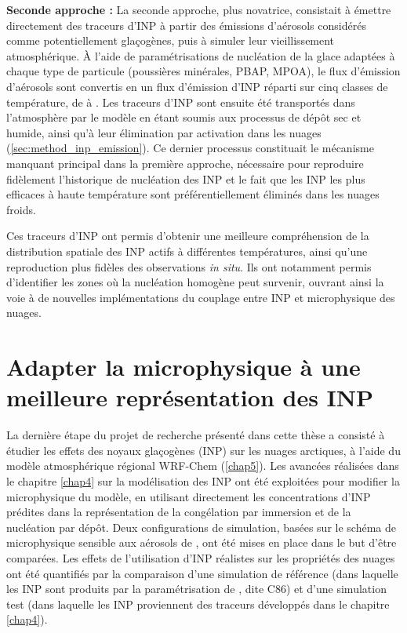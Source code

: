 \medskip
\noindent
\textbf{Seconde approche :}  
La seconde approche, plus novatrice, consistait à émettre directement des traceurs d’INP à partir des émissions d’aérosols considérés comme potentiellement glaçogènes, puis à simuler leur vieillissement atmosphérique.  
À l’aide de paramétrisations de nucléation de la glace adaptées à chaque type de particule (poussières minérales, PBAP, MPOA), le flux d’émission d’aérosols sont convertis en un flux d’émission d’INP réparti sur cinq classes de température, de  à .  
Les traceurs d’INP sont ensuite été transportés dans l’atmosphère par le modèle en étant soumis aux processus de dépôt sec et humide, ainsi qu’à leur élimination par activation dans les nuages (\cref{sec:method_inp_emission}).  
Ce dernier processus constituait le mécanisme manquant principal dans la première approche, nécessaire pour reproduire fidèlement l’historique de nucléation des INP et le fait que les INP les plus efficaces à haute température sont préférentiellement éliminés dans les nuages froids.  

Ces traceurs d’INP ont permis d’obtenir une meilleure compréhension de la distribution spatiale des INP actifs à différentes températures, ainsi qu'une reproduction plus fidèles des observations \textit{in situ}.  
Ils ont notamment permis d’identifier les zones où la nucléation homogène peut survenir, ouvrant ainsi la voie à de nouvelles implémentations du couplage entre INP et microphysique des nuages.


\section*{Adapter la microphysique à une meilleure représentation des INP}
La dernière étape du projet de recherche présenté dans cette thèse a consisté à étudier les effets des noyaux glaçogènes (INP) sur les nuages arctiques, à l’aide du modèle atmosphérique régional WRF-Chem (\cref{chap5}).  
Les avancées réalisées dans le chapitre \ref{chap4} sur la modélisation des INP ont été exploitées pour modifier la microphysique du modèle, en utilisant directement les concentrations d’INP prédites dans la représentation de la congélation par immersion et de la nucléation par dépôt.  
Deux configurations de simulation, basées sur le schéma de microphysique sensible aux aérosols de \citet{thompson_study_2014}, ont été mises en place dans le but d'être comparées.  
Les effets de l’utilisation d’INP réalistes sur les propriétés des nuages ont été quantifiés par la comparaison d’une simulation de référence (dans laquelle les INP sont produits par la paramétrisation de \citet{cooper_ice_1986}, dite C86) et d’une simulation test (dans laquelle les INP proviennent des traceurs développés dans le chapitre \ref{chap4}).

